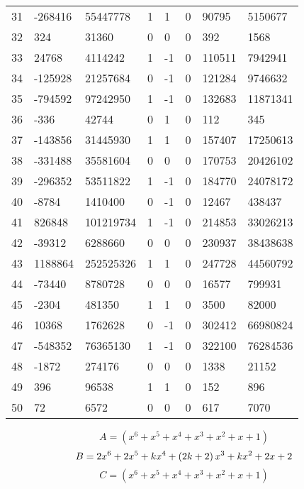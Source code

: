 \documentclass{amsart}
\begin{document}
\begin{longtable}{|l|l|l|lllll|}
31&-268416&55447778&1&1&0&90795&5150677\\
32&324&31360&0&0&0&392&1568\\
33&24768&4114242&1&-1&0&110511&7942941\\
34&-125928&21257684&0&-1&0&121284&9746632\\
35&-794592&97242950&1&-1&0&132683&11871341\\
36&-336&42744&0&1&0&112&345\\
37&-143856&31445930&1&1&0&157407&17250613\\
38&-331488&35581604&0&0&0&170753&20426102\\
39&-296352&53511822&1&-1&0&184770&24078172\\
40&-8784&1410400&0&-1&0&12467&438437\\
41&826848&101219734&1&-1&0&214853&33026213\\
42&-39312&6288660&0&0&0&230937&38438638\\
43&1188864&252525326&1&1&0&247728&44560792\\
44&-73440&8780728&0&0&0&16577&799931\\
45&-2304&481350&1&1&0&3500&82000\\
46&10368&1762628&0&-1&0&302412&66980824\\
47&-548352&76365130&1&-1&0&322100&76284536\\
48&-1872&274176&0&0&0&1338&21152\\
49&396&96538&1&1&0&152&896\\
50&72&6572&0&0&0&617&7070\\
\hline
\end{longtable}
$$A=(x^6
 + x^5
 + x^4
 + x^3
 + x^2
 + x
 + 1)$$
$$B=2\*x^6
 + 2\*x^5
 + k\*x^4
 + \left(2\*k
 + 2\right) \*x^3
 + k\*x^2
 + 2\*x
 + 2$$
$$C=(x^6
 + x^5
 + x^4
 + x^3
 + x^2
 + x
 + 1)$$
\end{document}
